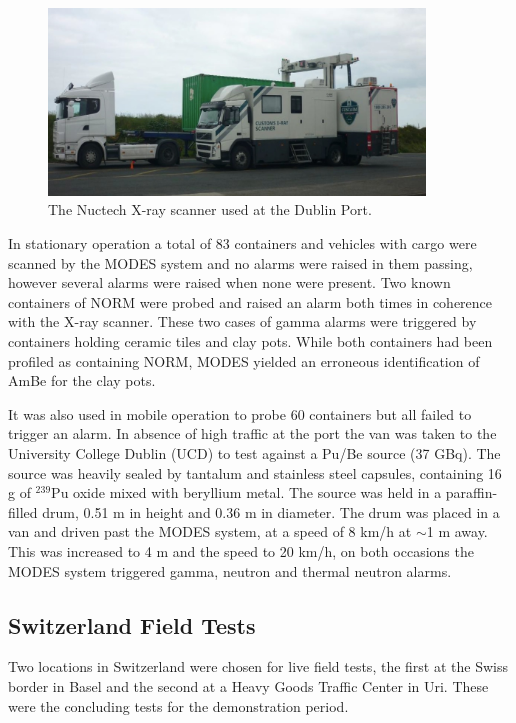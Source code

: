 \begin{figure}
\begin{center}
\includegraphics[width=100mm]{./Chapter7/figures/dublinXRayScanner1.jpg}
\end{center}
\caption{The Nuctech X-ray scanner used at the Dublin Port.}
\label{fig:dublinXRayScanner}
\end{figure}

In stationary operation a total of 83 containers and vehicles with cargo were scanned by the MODES system and no alarms were raised in them passing, however several alarms were raised when none were present. Two known containers of NORM were probed and raised an alarm both times in coherence with the X-ray scanner. These two cases of gamma alarms were triggered by containers holding ceramic tiles and clay pots. While both containers had been profiled as containing NORM, MODES yielded an erroneous identification of AmBe for the clay pots. 

It was also used in mobile operation to probe 60 containers but all failed to trigger an alarm. In absence of high traffic at the port the van was taken to the University College Dublin (UCD) to test against a Pu/Be source (37 GBq). The source was heavily sealed by tantalum and stainless steel capsules, containing 16 g of $^{239}$Pu oxide mixed with beryllium
metal. The source was held in a paraffin-filled drum, 0.51 m in height and 0.36 m in diameter. The drum was placed in a van and driven past the MODES system, at a speed of 8 km/h at $\sim$1 m away. This was increased to 4 m and the speed to 20 km/h, on both occasions the MODES system triggered gamma, neutron and thermal neutron alarms.

\subsection{Switzerland Field Tests}
Two locations in Switzerland were chosen for live field tests, the first at the Swiss border in Basel and the second at a Heavy Goods Traffic Center in Uri. These were the concluding  tests for the demonstration period.

